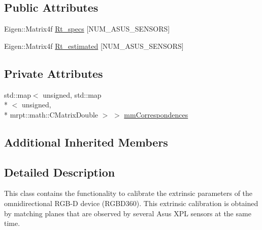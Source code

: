 \subsection*{Public Attributes}
\begin{DoxyCompactItemize}
\item 
Eigen\-::\-Matrix4f \hyperlink{classCalibrator_ada5174649775a64c103833f87d90ec3e}{Rt\-\_\-specs} \mbox{[}N\-U\-M\-\_\-\-A\-S\-U\-S\-\_\-\-S\-E\-N\-S\-O\-R\-S\mbox{]}
\item 
Eigen\-::\-Matrix4f \hyperlink{classCalibrator_a664327b52485de0d402bbc896ce1233f}{Rt\-\_\-estimated} \mbox{[}N\-U\-M\-\_\-\-A\-S\-U\-S\-\_\-\-S\-E\-N\-S\-O\-R\-S\mbox{]}
\end{DoxyCompactItemize}
\subsection*{Private Attributes}
\begin{DoxyCompactItemize}
\item 
std\-::map$<$ unsigned, std\-::map\\*
$<$ unsigned, \\*
mrpt\-::math\-::\-C\-Matrix\-Double $>$ $>$ \hyperlink{classCalibrator_aa11e0d4221b509241235755dde78e3cc}{mm\-Correspondences}
\end{DoxyCompactItemize}
\subsection*{Additional Inherited Members}


\subsection{Detailed Description}
This class contains the functionality to calibrate the extrinsic parameters of the omnidirectional R\-G\-B-\/\-D device (R\-G\-B\-D360). This extrinsic calibration is obtained by matching planes that are observed by several Asus X\-P\-L sensors at the same time. 

